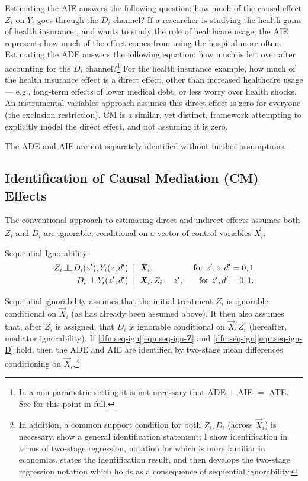 Estimating the AIE answers the following question: how much of the causal effect $Z_i$ on $Y_i$ goes through the $D_i$ channel?
If a researcher is studying the health gains of health insurance \citep{finkelstein2008oregon}, and wants to study the role of healthcare usage, the AIE represents how much of the effect comes from using the hospital more often.
Estimating the ADE answers the following equation: how much is left over after accounting for the $D_i$ channel?\footnote{
    In a non-parametric setting it is not necessary that ADE $+$ AIE $=$ ATE.
    See \cite{imai2010identification} for this point in full.
}
For the health insurance example, how much of the health insurance effect is a direct effect, other than increased healthcare usage --- e.g., long-term effects of lower medical debt, or less worry over health shocks.
An instrumental variables approach assumes this direct effect is zero for everyone (the exclusion restriction).
CM is a similar, yet distinct, framework attempting to explicitly model the direct effect, and not assuming it is zero.

The ADE and AIE are not separately identified without further assumptions.

\subsection{Identification of Causal Mediation (CM) Effects}
The conventional approach to estimating direct and indirect effects assumes both $Z_i$ and $D_i$ are ignorable, conditional on a vector of control variables $\vec X_i$.
\begin{definition}
    \label{dfn:seq-ign}
    Sequential Ignorability \citep{imai2010identification}
    \begin{align}
        \label{eqn:seq-ign-Z}
        Z_i \indep  D_i(z'), Y_i(z, d') \;\; &| \;\; \vec X_i,
            &\textnormal{ for } z', z, d' = 0, 1 \\
        \label{eqn:seq-ign-D}
        D_i \indep Y_i(z', d') \;\; &| \;\; \vec X_i, Z_i = z', 
            &\textnormal{ for } z', d' = 0, 1.
    \end{align}
\end{definition}
Sequential ignorability assumes that the initial treatment $Z_i$ is ignorable conditional on $\vec X_i$ (as has already been assumed above).
It then also assumes that, after $Z_i$ is assigned, that $D_i$ is ignorable conditional on $\vec X, Z_i$ (hereafter, mediator ignorability).
If \ref{dfn:seq-ign}\eqref{eqn:seq-ign-Z} and \ref{dfn:seq-ign}\eqref{eqn:seq-ign-D} hold, then the ADE and AIE are identified by two-stage mean differences conditioning on $\vec X_i$.\footnote{
    In addition, a common support condition for both $Z_i, D_i$ (across $\vec X_i$) is necessary.
    \cite{imai2010identification} show a general identification statement; I show identification in terms of two-stage regression, notation for which is more familiar in economics.
     states the \cite{imai2010identification} identification result, and then develops the two-stage regression notation which holds as a consequence of sequential ignorability.
}
\vspace{0.1cm}


